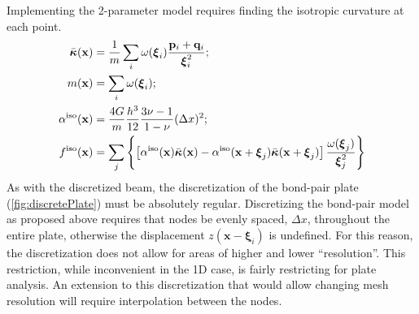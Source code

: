 Implementing the 2-parameter model requires finding the isotropic curvature at each point.
%
\begin{align*}
    \bar{\boldsymbol{\kappa}}(\mathbf{x}) &= \frac{1}{m} \sum_i \omega(\boldsymbol{\xi}_i)\frac{\mathbf{p}_i +\mathbf{q}_i }{\boldsymbol{\xi}_i^2};\notag \\
    m(\mathbf{x})  &= \sum_i \omega(\boldsymbol{\xi}_i); \notag \\
    \alpha^\text{iso}(\mathbf{x}) &= \frac{4G}{m}\frac{h^3}{12}\frac{3\nu-1}{1-\nu}(\Delta x)^2;\\
    f^\text{iso}(\mathbf{x}) &= \sum_j \left\{\left[\alpha^\text{iso}(\mathbf{x})\bar{\boldsymbol{\kappa}}(\mathbf{x})-\alpha^\text{iso}(\mathbf{x}+\boldsymbol{\xi}_j)\bar{\boldsymbol{\kappa}}(\mathbf{x}+\boldsymbol{\xi}_j) \right] \frac{\omega(\boldsymbol{\xi}_j)}{\boldsymbol{\xi}_j^2} \right\}
\end{align*}
%
As with the discretized beam, the discretization of the bond-pair plate (\cref{fig:discretePlate}) must be absolutely regular. 
Discretizing the bond-pair model as proposed above requires that nodes be evenly spaced, $\Delta x$, throughout the entire plate, otherwise the displacement \(z(\mathbf{x}-\boldsymbol{\xi}_i)\) is undefined.  For this reason, the discretization does not allow for areas of higher and lower ``resolution''.  This restriction, while inconvenient in the 1D case, is fairly restricting for plate analysis. An extension to this discretization that would allow changing mesh resolution will require interpolation between the nodes.  
%
%
%
%
%  
%
%

